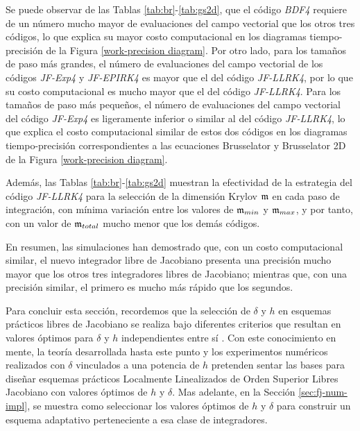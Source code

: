 Se puede observar de las Tablas \ref{tab:br}-\ref{tab:gs2d}, que el código \textit{BDF4} requiere de un número mucho mayor de evaluaciones del campo vectorial que los otros tres códigos, lo que explica su mayor costo computacional en los diagramas tiempo-precisión de la Figura \ref{work-precision diagram}. Por otro lado, para los tamaños de paso más grandes, el número de evaluaciones del campo vectorial de los códigos \textit{JF-Exp4} y \textit{JF-EPIRK4} es mayor que el del código \textit{JF-LLRK4}, por lo que su costo computacional es mucho mayor que el del código \textit{JF-LLRK4}. Para los tamaños de paso más pequeños, el número de evaluaciones del campo vectorial del código \textit{JF-Exp4} es ligeramente inferior o similar al del código \textit{JF-LLRK4}, lo que explica el costo computacional similar de estos dos códigos en los diagramas tiempo-precisión correspondientes a las ecuaciones Brusselator y Brusselator 2D de la Figura \ref{work-precision diagram}.

Además, las Tablas \ref{tab:br}-\ref{tab:gs2d} muestran la efectividad de la estrategia del código \textit{JF-LLRK4} para la selección de la dimensión Krylov $\mathfrak{m}$ en cada paso de integración, con mínima variación entre los valores de $\mathfrak{m}_{min}$ y $\mathfrak{m}_{max}$, y por tanto, con un valor de $\mathfrak{m}_{total}$ mucho menor que los demás códigos.

En resumen, las simulaciones han demostrado que, con un costo computacional similar, el nuevo integrador libre de Jacobiano presenta una precisión mucho mayor que los otros tres integradores libres de Jacobiano; mientras que, con una precisión similar, el primero es mucho más rápido que los segundos.

Para concluir esta sección, recordemos que la selección de $\delta$ y $h$ en esquemas prácticos libres de Jacobiano se realiza bajo diferentes criterios que resultan en valores óptimos para $\delta$ y $h$ independientes entre sí \cite{knoll2004jacobian}. Con este conocimiento en mente, la teoría desarrollada hasta este punto y los experimentos numéricos realizados con $\delta$ vinculados a una potencia de $h$ pretenden sentar las bases para diseñar esquemas prácticos Localmente Linealizados de Orden Superior Libres Jacobiano con valores óptimos de $h$ y $\delta$. Mas adelante, en la Sección \ref{sec:fj-num-impl}, se muestra como seleccionar los valores óptimos de $h$ y $\delta$ para construir un esquema adaptativo perteneciente a esa clase de integradores. 

